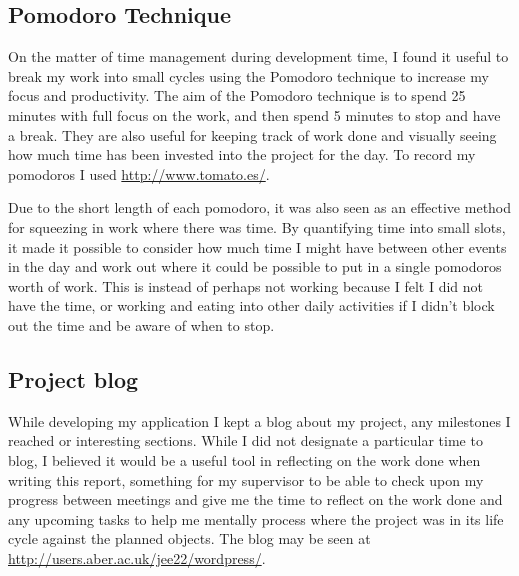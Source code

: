 \subsection{Pomodoro Technique}
On the matter of time management during development time, I found it useful to break my work into small cycles using the Pomodoro technique\cite{citeulike:14021988} to increase my focus and productivity. The aim of the Pomodoro technique is to spend 25 minutes with full focus on the work, and then spend 5 minutes to stop and have a break. They are also useful for keeping track of work done and visually seeing how much time has been invested into the project for the day. To record my pomodoros I used \url{http://www.tomato.es/}.
 
Due to the short length of each pomodoro, it was also seen as an effective method for squeezing in work where there was time. By quantifying time into small slots, it made it possible to consider how much time I might have between other events in the day and work out where it could be possible to put in a single pomodoros worth of work. This is instead of perhaps not working because I felt I did not have the time, or working and eating into other daily activities if I didn't block out the time and be aware of when to stop.

\subsection{Project blog}
While developing my application I kept a blog about my project, any milestones I reached or interesting sections. While I did not designate a particular time to blog, I believed it would be a useful tool in reflecting on the work done when writing this report, something for my supervisor to be able to check upon my progress between meetings and give me the time to reflect on the work done and any upcoming tasks to help me mentally process where the project was in its life cycle against the planned objects. The blog may be seen at \url{http://users.aber.ac.uk/jee22/wordpress/}.
